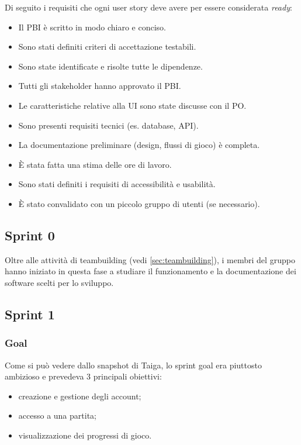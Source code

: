 \documentclass{article}
\begin{document}
Di seguito i requisiti che ogni user story deve avere per essere considerata \textit{ready}:

\begin{itemize}
    \item Il PBI è scritto in modo chiaro e conciso.
    \item Sono stati definiti criteri di accettazione testabili.
    \item Sono state identificate e risolte tutte le dipendenze.
    \item Tutti gli stakeholder hanno approvato il PBI.
    \item Le caratteristiche relative alla UI sono state discusse con il PO.
    \item Sono presenti requisiti tecnici (es. database, API).
    \item La documentazione preliminare (design, flussi di gioco) è completa.
    \item È stata fatta una stima delle ore di lavoro.
    \item Sono stati definiti i requisiti di accessibilità e usabilità.
    \item È stato convalidato con un piccolo gruppo di utenti (se necessario).
\end{itemize}

\subsection{Sprint 0}
Oltre alle attività di teambuilding (vedi \ref{sec:teambuilding}), i membri del gruppo hanno iniziato in questa fase a studiare
il funzionamento e la documentazione dei software scelti per lo sviluppo.

\subsection{Sprint 1}

\subsubsection{Goal}
Come si può vedere dallo snapshot di Taiga, lo sprint goal era piuttosto ambizioso e prevedeva 3 principali obiettivi:
\begin{itemize}
    \item creazione e gestione degli account;
    \item accesso a una partita;
    \item visualizzazione dei progressi di gioco.
\end{itemize}
\end{document}
